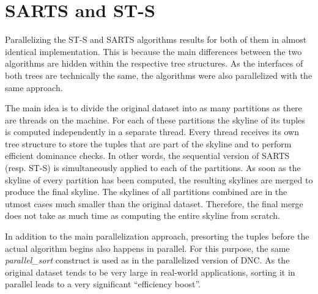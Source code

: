 \section{SARTS and ST-S}
Parallelizing the ST-S and SARTS algorithms results for both of them in almost identical implementation. This is because the main differences between the two algorithms are hidden within the respective tree structures. As the interfaces of both trees are technically the same, the algorithms were also parallelized with the same approach. 

The main idea is to divide the original dataset into as many partitions as there are threads on the machine. For each of these partitions the skyline of its tuples is computed independently in a separate thread. Every thread receives its own tree structure to store the tuples that are part of the skyline and to perform efficient dominance checks. In other words, the sequential version of SARTS (resp. ST-S) is simultaneously applied to each of the partitions. As soon as the skyline of every partition has been computed, the resulting skylines are merged to produce the final skyline. The skylines of all partitions combined are in the utmost cases much smaller than the original dataset. Therefore, the final merge does not take as much time as computing the entire skyline from scratch. 


In addition to the main parallelization approach, presorting the tuples before the actual algorithm begins also happens in parallel. For this purpose, the same \textit{parallel\_sort} construct is used as in the parallelized version of DNC. As the original dataset tends to be very large in real-world applications, sorting it in parallel leads to a very significant ``efficiency boost''. %

